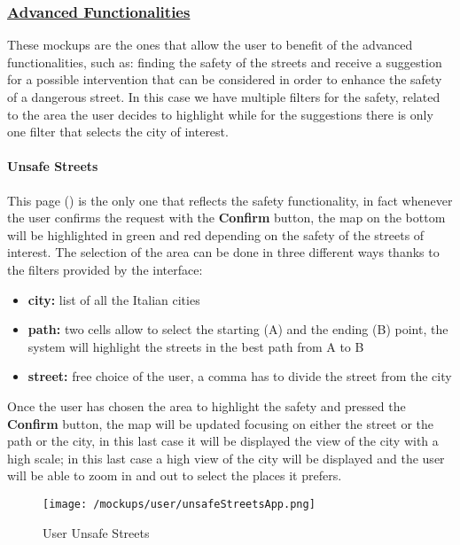 		\subsubsection[Advanced Functionalities]{\hyperlink{toc}{Advanced Functionalities}}
			\label{sec:userAdvancedFunctionalities}
			
			These mockups are the ones that allow the user to benefit of the advanced functionalities, such as: finding the safety of the streets and receive a suggestion for a possible intervention that can be considered in order to enhance the safety of a dangerous street. In this case we have multiple filters for the safety, related to the area the user decides to highlight while for the suggestions there is only one filter that selects the city of interest.
			
			\paragraph{Unsafe Streets}
			This page () is the only one that reflects the safety functionality, in fact whenever the user confirms the request with the \textbf{Confirm}
			button, the map on the bottom will be highlighted in green and red depending on the safety of the streets of interest. The selection of the area can be done in three different ways thanks to the filters provided by the interface:
			
			\begin{itemize}
				\item \textbf{city:} list of all the Italian cities
				\item \textbf{path:} two cells allow to select the starting (A) and the ending (B) point, the system will highlight the streets in the best path from A to B
				\item \textbf{street:} free choice of the user, a comma has to divide the street from the city
			\end{itemize}
		
			Once the user has chosen the area to highlight the safety and pressed the \textbf{Confirm} button, the map will be updated focusing on either the street or the path or the city, in this last case it will be displayed the view of the city with a high scale; in this last case a high view of the city will be displayed and the user will be able to zoom in and out to select the places it prefers.
			
			\begin{figure}[ht!]
				\centering
				\texttt{[image: /mockups/user/unsafeStreetsApp.png]}
				\caption{\label{fig:unsafeStreetsApp} User Unsafe Streets}
			\end{figure}
		

